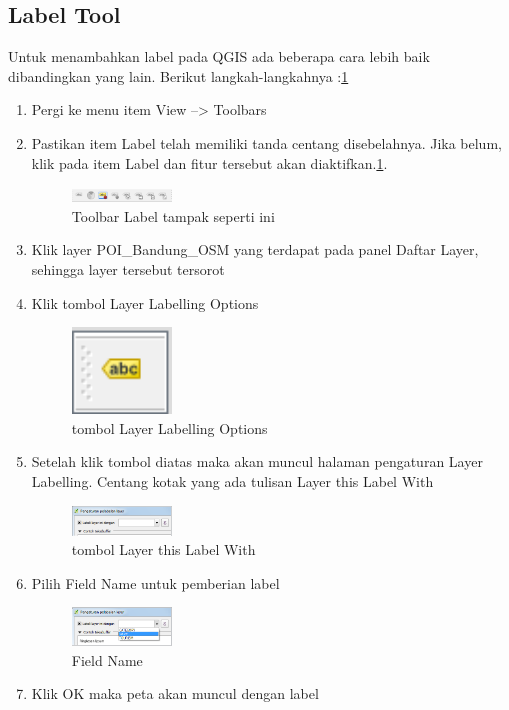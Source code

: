 \subsection{Label Tool}
Untuk menambahkan label pada QGIS ada beberapa cara lebih baik dibandingkan yang lain. Berikut langkah-langkahnya :\ref{qgis:label}
\begin{enumerate}
\item
Pergi ke menu item View --> Toolbars
\item
Pastikan item Label telah memiliki tanda centang disebelahnya. Jika belum, klik pada item Label dan fitur tersebut akan diaktifkan.\ref{qgis:label}.
\begin{figure}[ht]
    \centerline{\includegraphics[width=0.25\textwidth]{figures/label}}
    \caption{Toolbar Label tampak seperti ini}
    \label{qgis:label}
    \end{figure}
\item
Klik layer POI\_Bandung\_OSM yang terdapat pada panel Daftar Layer, sehingga layer tersebut tersorot
\item
Klik tombol Layer Labelling Options
\begin{figure}[ht]
    \centerline{\includegraphics[width=0.25\textwidth]{figures/layer}}
    \caption{tombol Layer Labelling Options}
    \label{qgis:layer}
    \end{figure}
\item
Setelah klik tombol diatas maka akan muncul halaman pengaturan Layer Labelling. Centang kotak yang ada tulisan Layer this Label With
\begin{figure}[ht]
    \centerline{\includegraphics[width=0.25\textwidth]{figures/laylabel}}
    \caption{tombol Layer this Label With}
    \label{qgis:laylabel}
    \end{figure}
\item
Pilih Field Name untuk pemberian label
\begin{figure}[ht]
    \centerline{\includegraphics[width=0.25\textwidth]{figures/name}}
    \caption{Field Name}
    \label{qgis:name}
    \end{figure}
\item
Klik OK maka peta akan muncul dengan label
\end{enumerate}

